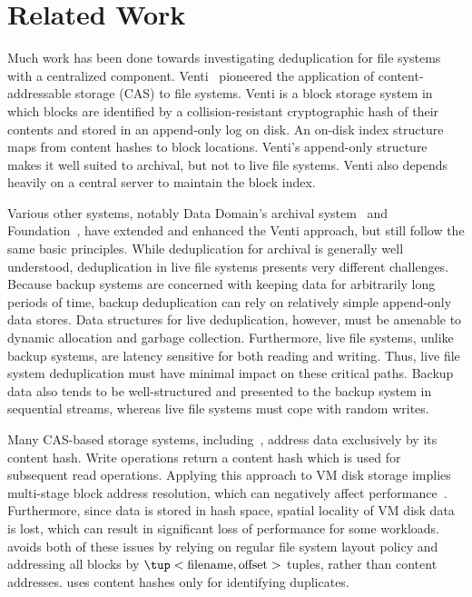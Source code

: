 
\section{Related Work}
\label{sec:related}

Much work has been done towards investigating deduplication for file
systems with a centralized component.
%
Venti~\cite{quinlan02venti} pioneered the application of
content-addressable storage (CAS) to file systems.  Venti is a block
storage system in which blocks are identified by a collision-resistant
cryptographic hash of their contents and stored in an
append-only log on disk. An on-disk index structure maps from
content hashes to block locations.  Venti's append-only
structure makes it well suited to archival, but not to live file
systems.  Venti also depends heavily on a central server to maintain
the block index.

Various other systems, notably Data Domain's
archival system~\cite{zhu08datadomain} and
Foundation~\cite{rhea-foundation}, have extended and enhanced the
Venti approach, but still follow the same basic principles.
While deduplication for archival is generally well understood,
deduplication in live file systems presents very different challenges.
Because backup systems are concerned with keeping data for arbitrarily
long periods of time, backup deduplication can rely on relatively
simple append-only data stores.  Data structures for live
deduplication, however, must be amenable to dynamic allocation and
garbage collection.  Furthermore, live file systems, unlike backup
systems, are latency sensitive for both reading and writing.  Thus,
live file system deduplication must have minimal impact on these critical
paths. Backup data also tends to be well-structured and presented to
the backup system in sequential streams, whereas live file systems must
cope with random writes.

Many CAS-based storage systems,
including~\cite{centeradatasheet,quinlan02venti,murali-capfs},
address data exclusively by its content hash.  Write operations return
a content hash which is used for subsequent read operations.  Applying
this approach to VM disk storage implies multi-stage block address
resolution, which can
negatively affect performance~\cite{cas-experiences}.  Furthermore,
since data is stored in hash space, spatial locality of VM disk
data is lost, which can result in significant loss of performance for
some workloads.  \DeDe avoids both of these issues by relying on
regular file system layout policy and addressing all blocks by
$\tup<\text{filename},\text{offset}>$ tuples, rather than content
addresses.  \DeDe uses content hashes only for identifying duplicates.

